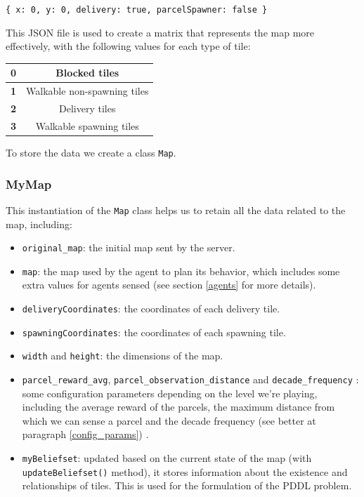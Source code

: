 \documentclass[10pt]{article}
\begin{document}
\begin{center}
    \texttt{\{ x: 0, y: 0, delivery: true, parcelSpawner: false \}}
\end{center}

This JSON file is used to create a matrix that represents the map more effectively, with the following values for each type of tile:

\begin{table}[h]
    \centering
    \begin{tabular}{|c|c|}
        \hline
        \textbf{0} & Blocked tiles \\
        \hline
        \textbf{1} & Walkable non-spawning tiles \\
        \hline
        \textbf{2} & Delivery tiles \\
        \hline
        \textbf{3} & Walkable spawning tiles \\
        \hline
    \end{tabular}
    \label{tab}
\end{table}

To store the data we create a class \texttt{Map}.

\subsubsection{MyMap}
This instantiation of the \texttt{Map} class helps us to retain all the data related to the map, including:

\begin{itemize}
    \item \texttt{original\_map}: the initial map sent by the server.
    \item \texttt{map}: the map used by the agent to plan its behavior, which includes some extra values for agents sensed (see section \ref{agents} for more details).
    \item \texttt{deliveryCoordinates}: the coordinates of each delivery tile.
    \item \texttt{spawningCoordinates}: the coordinates of each spawning tile.
    \item \texttt{width} and \texttt{height}: the dimensions of the map.
    \item \texttt{parcel\_reward\_avg}, \texttt{parcel\_observation\_distance} and \texttt{decade\_frequency} : some configuration parameters depending on the level we're playing, including the average reward of the parcels, the maximum distance from which we can sense a parcel and the decade frequency (see better at paragraph \ref{config_params}) .
    \item \texttt{myBeliefset}: updated based on the current state of the map (with \texttt{updateBeliefset()} method), it stores information about the existence and relationships of tiles. This is used for the formulation of the PDDL problem.
\end{itemize}
\end{document}
